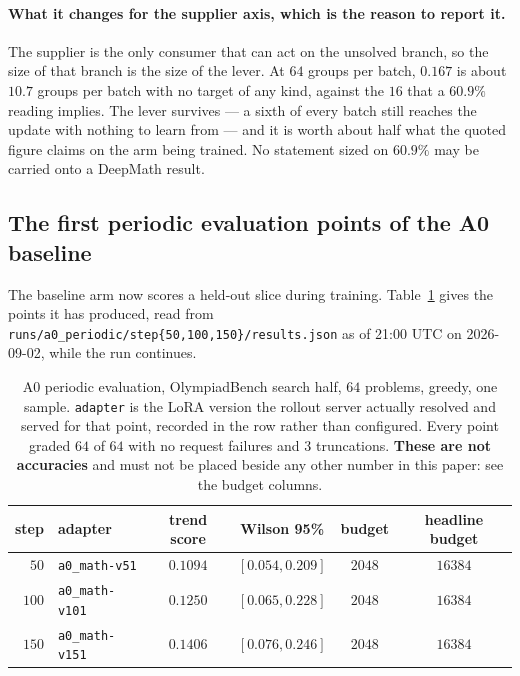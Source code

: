 \paragraph{What it changes for the supplier axis, which is the reason to report it.} The
supplier is the only consumer that can act on the unsolved branch, so the size of that branch
is the size of the lever. At $64$ groups per batch, $0.167$ is about $10.7$ groups per batch
with no target of any kind, against the $16$ that a $60.9\%$ reading implies. The lever
survives --- a sixth of every batch still reaches the update with nothing to learn from --- and
it is worth about half what the quoted figure claims on the arm being trained. No statement
sized on $60.9\%$ may be carried onto a DeepMath result.

\subsection{The first periodic evaluation points of the A0 baseline}
\label{sec:pereval}

The baseline arm now scores a held-out slice during training. Table~\ref{tab:pereval} gives
the points it has produced, read from \texttt{runs/a0\_periodic/step\{50,100,150\}/results.json}
as of 21:00 UTC on 2026-09-02, while the run continues.

\begin{table}[t]
\centering\small
\caption{A0 periodic evaluation, OlympiadBench search half, $64$ problems, greedy, one sample.
\texttt{adapter} is the LoRA version the rollout server actually resolved and served for that
point, recorded in the row rather than configured. Every point graded $64$ of $64$ with no
request failures and $3$ truncations. \textbf{These are not accuracies} and must not be placed
beside any other number in this paper: see the budget columns.}
\label{tab:pereval}
\begin{tabular}{rlcccc}
\toprule
step & adapter & trend score & Wilson 95\% & budget & headline budget \\
\midrule
$50$  & \texttt{a0\_math-v51}  & $0.1094$ & $[0.054, 0.209]$ & $2048$ & $16384$ \\
$100$ & \texttt{a0\_math-v101} & $0.1250$ & $[0.065, 0.228]$ & $2048$ & $16384$ \\
$150$ & \texttt{a0\_math-v151} & $0.1406$ & $[0.076, 0.246]$ & $2048$ & $16384$ \\
\bottomrule
\end{tabular}
\end{table}

